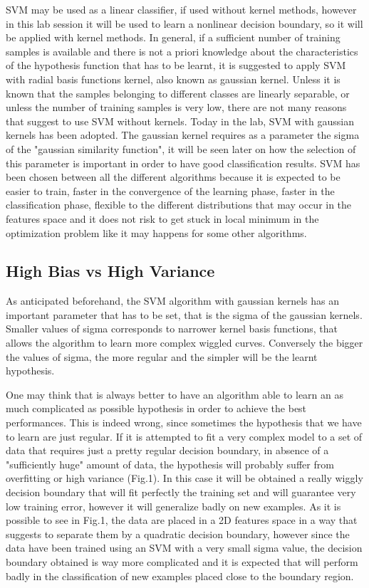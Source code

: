 \documentclass[aps,letterpaper,10pt]{revtex4}
\begin{document}
SVM may be used as a linear classifier, if used without kernel methods, however in this lab session it will be used to learn a nonlinear decision boundary, so it will be applied with kernel methods. In general, if a sufficient number of training samples is available and there is not a priori knowledge about the characteristics of the hypothesis function that has to be learnt, it is suggested to apply SVM with radial basis functions kernel, also known as gaussian kernel. Unless it is known that the samples belonging to different classes are linearly separable, or unless the number of training samples is very low, there are not many reasons that suggest to use SVM without kernels. Today in the lab, SVM with gaussian kernels has been adopted. The gaussian kernel requires as a parameter the sigma of the "gaussian similarity function", it will be seen later on how the selection of this parameter is important in order to have good classification results. SVM has been chosen between all the different algorithms because it is expected to be easier to train, faster in the convergence of the learning phase, faster in the classification phase, flexible to the different distributions that may occur in the features space and it does not risk to get stuck in local minimum in the optimization problem like it may happens for some other algorithms.

\subsection{High Bias vs High Variance}
As anticipated beforehand, the SVM algorithm with gaussian kernels has an important parameter that has to be set, that is the sigma of the gaussian kernels. Smaller values of sigma corresponds to narrower kernel basis functions, that allows the algorithm to learn more complex wiggled curves. Conversely the bigger the values of sigma, the more regular and the simpler will be the learnt hypothesis. 

One may think that is always better to have an algorithm able to learn an as much complicated as possible hypothesis in order to achieve the best performances. This is indeed wrong, since sometimes the hypothesis that we have to learn are just regular. If it is attempted to fit a very complex model to a set of data that requires just a pretty regular decision boundary, in absence of a "sufficiently huge" amount of data, the hypothesis will probably suffer from overfitting or high variance (Fig.1). In this case it will be obtained a really wiggly decision boundary that will fit perfectly the training set and will guarantee very low training error, however it will generalize badly on new examples. As it is possible to see in Fig.1, the data are placed in a 2D features space in a way that suggests to separate them by a quadratic decision boundary, however since the data have been trained using an SVM with a very small sigma value, the decision boundary obtained is way more complicated and it is expected that will perform badly in the classification of new examples placed close to the boundary region. 
\end{document}
